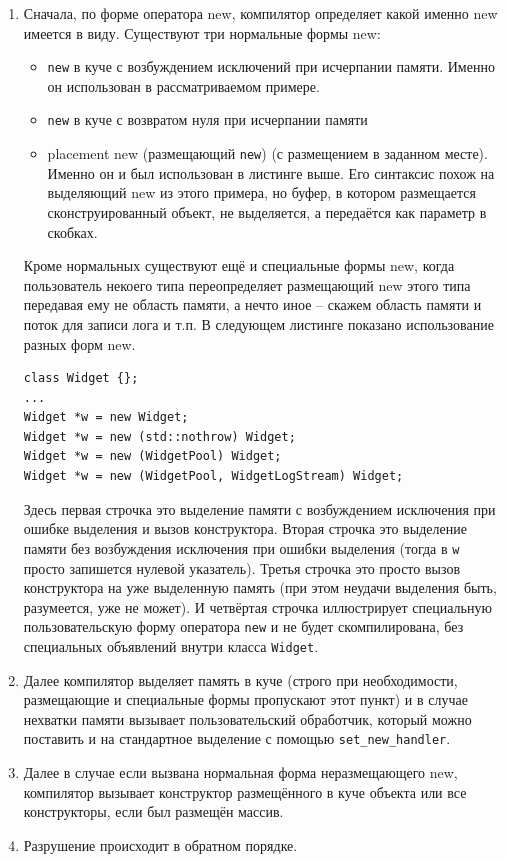 \documentclass[a4paper,12pt,oneside]{article}
\begin{document}
\begin{enumerate}
\item
Сначала, по форме оператора new, компилятор определяет какой именно new имеется в виду. Существуют три нормальные формы new:
\begin{itemize}
\item
\lstinline!new! в куче с возбуждением исключений при исчерпании памяти. Именно он использован в рассматриваемом примере.
\item
\lstinline!new! в куче с возвратом нуля при исчерпании памяти
\item
placement new (размещающий \lstinline!new!) (с размещением в заданном месте). Именно он и был использован в листинге выше. Его синтаксис похож на выделяющий new из этого примера, но буфер, в котором размещается сконструированный объект, не выделяется, а передаётся как параметр в скобках.
\end{itemize}

Кроме нормальных существуют ещё и специальные формы new, когда пользователь некоего типа переопределяет размещающий new этого типа передавая ему не область памяти, а нечто иное -- скажем область памяти и поток для записи лога и т.п. В следующем листинге показано использование разных форм new.

\begin{lstlisting}
class Widget {};
...
Widget *w = new Widget;
Widget *w = new (std::nothrow) Widget;
Widget *w = new (WidgetPool) Widget;
Widget *w = new (WidgetPool, WidgetLogStream) Widget;
\end{lstlisting}

Здесь первая строчка это выделение памяти с возбуждением исключения при ошибке выделения и вызов конструктора. Вторая строчка это выделение памяти без возбуждения исключения при ошибки выделения (тогда в \lstinline!w! просто запишется нулевой указатель). Третья строчка это просто вызов конструктора на уже выделенную память (при этом неудачи выделения быть, разумеется, уже не может). И четвёртая строчка иллюстрирует специальную пользовательскую форму оператора \lstinline!new! и не будет скомпилирована, без специальных объявлений внутри класса \lstinline!Widget!.

\item
Далее компилятор выделяет память в куче (строго при необходимости, размещающие и специальные формы пропускают этот пункт) и в случае нехватки памяти вызывает пользовательский обработчик, который можно поставить и на стандартное выделение с помощью \lstinline!set_new_handler!.
\item
Далее в случае если вызвана нормальная форма неразмещающего new, компилятор вызывает конструктор размещённого в куче объекта или все конструкторы, если был размещён массив.
\item
Разрушение происходит в обратном порядке.
\end{enumerate}
\end{document}
